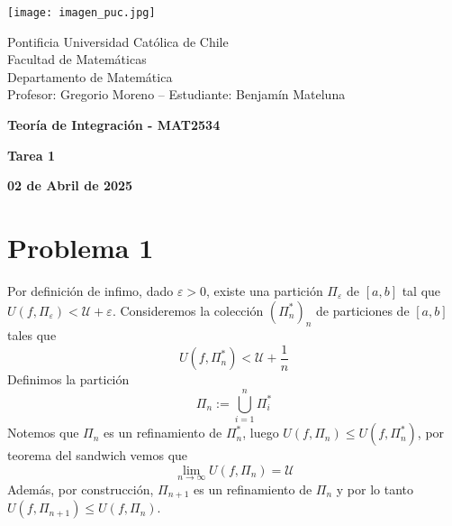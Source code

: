 \documentclass{article}
\begin{document}
\begin{minipage}{2.5cm}
    \texttt{[image: imagen\_puc.jpg]}
\end{minipage}
\begin{minipage}{14cm}
    {\sc Pontificia Universidad Católica de Chile\\
    Facultad de Matemáticas\\
    Departamento de Matemática\\
    Profesor: Gregorio Moreno -- Estudiante: Benjamín Mateluna}
\end{minipage}
\vspace{1ex}

{\centerline{\bf Teoría de Integración - MAT2534}
\centerline{\bf Tarea 1}}
\centerline{\bf 02 de Abril de 2025}

\section*{Problema 1}
\noindent Por definición de infimo, dado $\varepsilon>0$, existe una partición $\Pi_{\varepsilon}$ 
de $[a,b]$ tal que $U(f,\Pi_{\varepsilon})<\mathcal{U}+\varepsilon$. Consideremos la colección
$\left(\Pi^{*}_{n}\right)_{n}$ de particiones de $[a,b]$ tales que
\begin{equation*}
    U(f,\Pi^{*}_{n})<\mathcal{U}+\frac{1}{n}
\end{equation*}
Definimos la partición
\begin{equation*}
    \Pi_{n}:=\bigcup_{i=1}^{n}\Pi^{*}_{i}
\end{equation*}
Notemos que $\Pi_{n}$ es un refinamiento de $\Pi^{*}_{n}$, luego $U(f,\Pi_{n})\leq 
U(f,\Pi^{*}_{n})$, por teorema del sandwich vemos que
\begin{equation*}
    \lim_{n\to\infty}U(f,\Pi_{n})=\mathcal{U}
\end{equation*}
Además, por construcción, $\Pi_{n+1}$ es un refinamiento de $\Pi_{n}$ y por lo tanto 
$U(f,\Pi_{n+1})\leq U(f,\Pi_{n})$.
\end{document}
